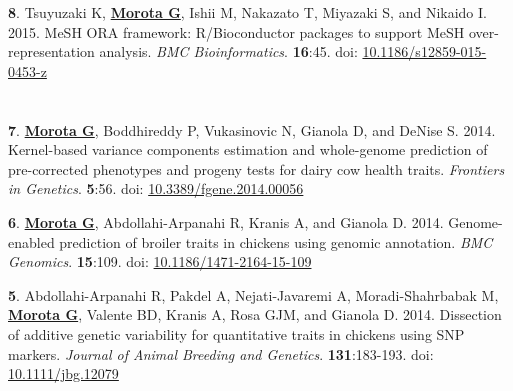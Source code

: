 \documentclass[margin,line,10pt]{res}
\newenvironment{list1}{
  \begin{list}{\ding{113}}{%
      \setlength{\itemsep}{0in}
      \setlength{\parsep}{0in} \setlength{\parskip}{0in}
      \setlength{\topsep}{0in} \setlength{\partopsep}{0in} 
      \setlength{\leftmargin}{0.17in}}}{\end{list}}
\begin{document}
\begin{resume}
\begin{list1}
\vspace{0.5cm}

\item [{\bf 8}.]  Tsuyuzaki K, {\bf \underline{Morota G}}, Ishii M, Nakazato T, Miyazaki S, and Nikaido I. 2015. 
  MeSH ORA framework: R/Bioconductor packages to support MeSH over-representation analysis. \emph{BMC Bioinformatics}. {\bf 16}:45. doi: \textcolor{blue}{\href{http://dx.doi.org/10.1186/s12859-015-0453-z}{10.1186/s12859-015-0453-z}} 

\end{list1}


\section{}

\begin{list1}


\item [{\bf 7}.]  {\bf \underline{Morota G}}, Boddhireddy P, Vukasinovic N, Gianola D, and DeNise S.  2014. Kernel-based variance components estimation and  whole-genome prediction of pre-corrected phenotypes and progeny tests for dairy cow health traits. \emph{Frontiers in Genetics}. {\bf 5}:56. doi: \textcolor{blue}{\href{http://dx.doi.org/10.3389/fgene.2014.00056}{10.3389/fgene.2014.00056}} 

\vspace{0.5cm}

\item [{\bf 6}.]  {\bf \underline{Morota G}}, Abdollahi-Arpanahi R, Kranis A, and Gianola D. 2014.   
     Genome-enabled prediction of broiler traits in chickens using genomic annotation. \emph{BMC Genomics}. {\bf 15}:109. doi: \textcolor{blue}{\href{http://dx.doi.org/10.1186/1471-2164-15-109}{10.1186/1471-2164-15-109}}
    

\vspace{0.5cm}

\item [{\bf 5}.]  Abdollahi-Arpanahi R, Pakdel A, Nejati-Javaremi A, Moradi-Shahrbabak M, 
     {\bf \underline{Morota G}}, Valente BD, Kranis A, Rosa GJM, and Gianola D. 2014.
     Dissection of additive genetic variability for quantitative traits in chickens using SNP markers. \emph{Journal of Animal Breeding and Genetics}. \textbf{131}:183-193. doi: \textcolor{blue}{\href{http://dx.doi.org/10.1111/jbg.12079}{10.1111/jbg.12079}}

\vspace{0.5cm}


\end{list1}
\end{resume}
\end{document}
